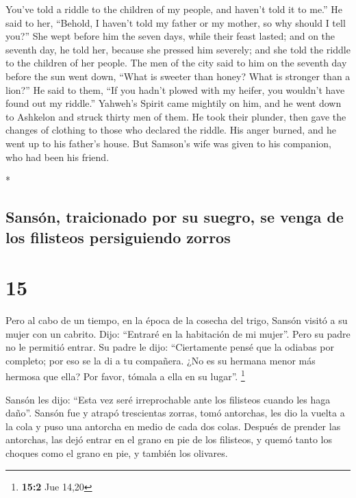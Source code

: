 \begin{paracol}{2}
\begin{otherlanguage}{english}
You've told a riddle to the children of my people, and haven't told it
to me.'' He said to her, ``Behold, I haven't told my father or my
mother, so why should I tell you?''  She wept before him
the seven days, while their feast lasted; and on the seventh day, he
told her, because she pressed him severely; and she told the riddle to
the children of her people.  The men of the city said to
him on the seventh day before the sun went down, ``What is sweeter than
honey? What is stronger than a lion?'' He said to them, ``If you hadn't
plowed with my heifer, you wouldn't have found out my riddle.''
 Yahweh's Spirit came mightily on him, and he went down
to Ashkelon and struck thirty men of them. He took their plunder, then
gave the changes of clothing to those who declared the riddle. His anger
burned, and he went up to his father's house.  But
Samson's wife was given to his companion, who had been his friend.

\end{otherlanguage}

\switchcolumn[0]*

\hypertarget{sansuxf3n-traicionado-por-su-suegro-se-venga-de-los-filisteos-persiguiendo-zorros}{%
\subsection{Sansón, traicionado por su suegro, se venga de los filisteos
persiguiendo
zorros}\label{sansuxf3n-traicionado-por-su-suegro-se-venga-de-los-filisteos-persiguiendo-zorros}}

\hypertarget{section-28}{%
\section{15}\label{section-28}}

 Pero al cabo de un tiempo, en la época de la cosecha del
trigo, Sansón visitó a su mujer con un cabrito. Dijo: ``Entraré en la
habitación de mi mujer''. Pero su padre no le permitió entrar.
 Su padre le dijo: ``Ciertamente pensé que la odiabas por
completo; por eso se la di a tu compañera. ¿No es su hermana menor más
hermosa que ella? Por favor, tómala a ella en su lugar''. \footnote{\textbf{15:2}
  Jue 14,20}

 Sansón les dijo: ``Esta vez seré irreprochable ante los
filisteos cuando les haga daño''.  Sansón fue y atrapó
trescientas zorras, tomó antorchas, les dio la vuelta a la cola y puso
una antorcha en medio de cada dos colas.  Después de
prender las antorchas, las dejó entrar en el grano en pie de los
filisteos, y quemó tanto los choques como el grano en pie, y también los
olivares.


\end{paracol}
